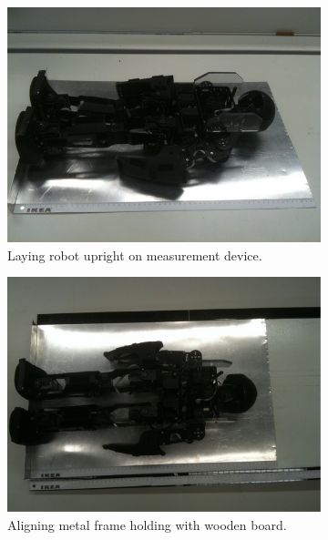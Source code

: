 {\begin{figure}
  \begin{subfigure}{.45\textwidth}
    \centering
    \includegraphics[width=\textwidth]{img/com-measurement-step1}
    \caption{Laying robot upright on measurement device.}
    \label{fig:com-measurement-1}
  \end{subfigure}
  \hfill
  \begin{subfigure}{.45\textwidth}
    \centering
    \includegraphics[width=\textwidth]{img/com-measurement-step2}
    \caption{Aligning metal frame holding with wooden board.}
      \label{fig:com-measurement-2}
  \end{subfigure}
  \\
  \begin{subfigure}{.45\textwidth}

\end{subfigure}
\end{figure}}
